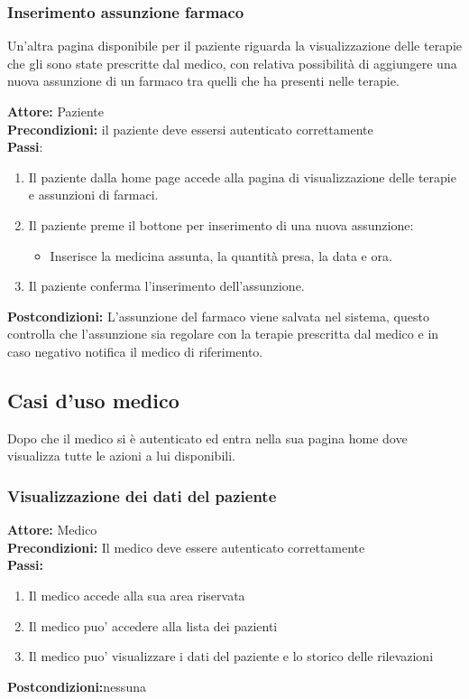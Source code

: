\documentclass{article}
\begin{document}
\subsubsection{Inserimento assunzione farmaco}
Un'altra pagina disponibile per il paziente riguarda la visualizzazione delle terapie che gli sono state prescritte dal medico, con relativa possibilità di aggiungere una nuova assunzione di un farmaco tra quelli che ha presenti nelle terapie.
\begin{mdframed}
   \textbf{Attore:} Paziente \\
   \textbf{Precondizioni:} il paziente deve essersi autenticato correttamente \\
   \textbf{Passi}:
   \begin{enumerate}
       \item Il paziente dalla home page accede alla pagina di visualizzazione delle terapie e assunzioni di farmaci.
       \item Il paziente preme il bottone per inserimento di una nuova assunzione:
       \begin{itemize}
           \item Inserisce la medicina assunta, la quantità presa, la data e ora.
       \end{itemize}
       \item Il paziente conferma l'inserimento dell'assunzione.
   \end{enumerate}
   \textbf{Postcondizioni:} L'assunzione del farmaco viene salvata nel sistema, questo controlla che l'assunzione sia regolare con la terapie prescritta dal medico e in caso negativo notifica il medico di riferimento.
\end{mdframed}




\subsection{Casi d'uso medico}
Dopo che il medico si è autenticato ed entra nella sua pagina home dove visualizza tutte le azioni a lui disponibili.
\subsubsection{Visualizzazione dei dati del paziente}
\begin{mdframed}
   \textbf{Attore:} Medico \\
   \textbf{Precondizioni:} Il medico deve essere autenticato correttamente \\
   \textbf{Passi:}
   \begin{enumerate}
       \item Il medico accede alla sua area riservata
       \item Il medico puo' accedere alla lista dei pazienti
       \item Il medico puo' visualizzare i dati del paziente e lo storico delle rilevazioni
   \end{enumerate}
   \textbf{Postcondizioni:}nessuna
\end{mdframed}
\end{document}
